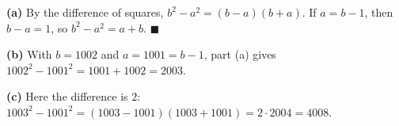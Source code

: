 \textbf{(a)} By the difference of squares, $b^2-a^2=(b-a)(b+a)$. If $a=b-1$, then $b-a=1$, so $b^2-a^2=a+b$. $\blacksquare$

\textbf{(b)} With $b=1002$ and $a=1001=b-1$, part (a) gives $1002^2-1001^2=1001+1002=\boxed{2003}$.

\textbf{(c)} Here the difference is $2$: $1003^2-1001^2=(1003-1001)(1003+1001)=2\cdot2004=\boxed{4008}$.
